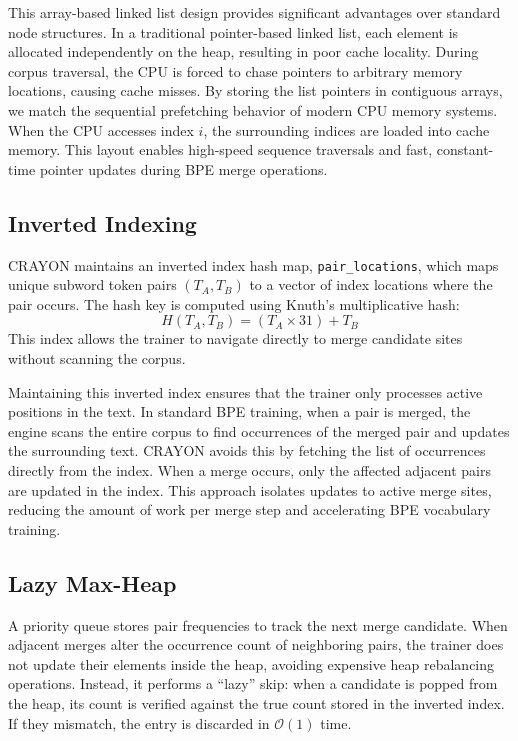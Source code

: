 \documentclass[10pt,journal,compsoc]{IEEEtran}
\begin{document}
This array-based linked list design provides significant advantages over standard node structures. In a traditional pointer-based linked list, each element is allocated independently on the heap, resulting in poor cache locality. During corpus traversal, the CPU is forced to chase pointers to arbitrary memory locations, causing cache misses. By storing the list pointers in contiguous arrays, we match the sequential prefetching behavior of modern CPU memory systems. When the CPU accesses index $i$, the surrounding indices are loaded into cache memory. This layout enables high-speed sequence traversals and fast, constant-time pointer updates during BPE merge operations.

\subsection{Inverted Indexing}
CRAYON maintains an inverted index hash map, \texttt{pair\_locations}, which maps unique subword token pairs $(T_A, T_B)$ to a vector of index locations where the pair occurs. The hash key is computed using Knuth's multiplicative hash:
\begin{equation}
H(T_A, T_B) = (T_A \times 31) + T_B
\end{equation}
This index allows the trainer to navigate directly to merge candidate sites without scanning the corpus.

Maintaining this inverted index ensures that the trainer only processes active positions in the text. In standard BPE training, when a pair is merged, the engine scans the entire corpus to find occurrences of the merged pair and updates the surrounding text. CRAYON avoids this by fetching the list of occurrences directly from the index. When a merge occurs, only the affected adjacent pairs are updated in the index. This approach isolates updates to active merge sites, reducing the amount of work per merge step and accelerating BPE vocabulary training.

\subsection{Lazy Max-Heap}
A priority queue stores pair frequencies to track the next merge candidate. When adjacent merges alter the occurrence count of neighboring pairs, the trainer does not update their elements inside the heap, avoiding expensive heap rebalancing operations. Instead, it performs a ``lazy'' skip: when a candidate is popped from the heap, its count is verified against the true count stored in the inverted index. If they mismatch, the entry is discarded in $\mathcal{O}(1)$ time.
\end{document}
